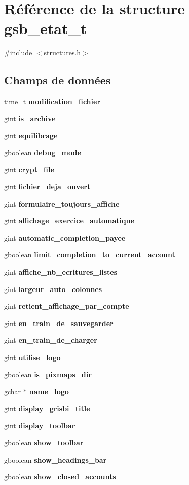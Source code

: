 \section{Référence de la structure gsb\_\-etat\_\-t}
\label{structgsb__etat__t}


{\ttfamily \#include $<$structures.h$>$}

\subsection*{Champs de données}
\begin{DoxyCompactItemize}
\item 
time\_\-t {\bf modification\_\-fichier}
\item 
gint {\bf is\_\-archive}
\item 
gint {\bf equilibrage}
\item 
gboolean {\bf debug\_\-mode}
\item 
gint {\bf crypt\_\-file}
\item 
gint {\bf fichier\_\-deja\_\-ouvert}
\item 
gint {\bf formulaire\_\-toujours\_\-affiche}
\item 
gint {\bf affichage\_\-exercice\_\-automatique}
\item 
gint {\bf automatic\_\-completion\_\-payee}
\item 
gboolean {\bf limit\_\-completion\_\-to\_\-current\_\-account}
\item 
gint {\bf affiche\_\-nb\_\-ecritures\_\-listes}
\item 
gint {\bf largeur\_\-auto\_\-colonnes}
\item 
gint {\bf retient\_\-affichage\_\-par\_\-compte}
\item 
gint {\bf en\_\-train\_\-de\_\-sauvegarder}
\item 
gint {\bf en\_\-train\_\-de\_\-charger}
\item 
gint {\bf utilise\_\-logo}
\item 
gboolean {\bf is\_\-pixmaps\_\-dir}
\item 
gchar $\ast$ {\bf name\_\-logo}
\item 
gint {\bf display\_\-grisbi\_\-title}
\item 
gint {\bf display\_\-toolbar}
\item 
gboolean {\bf show\_\-toolbar}
\item 
gboolean {\bf show\_\-headings\_\-bar}
\item 
gboolean {\bf show\_\-closed\_\-accounts}

\end{DoxyCompactItemize}
